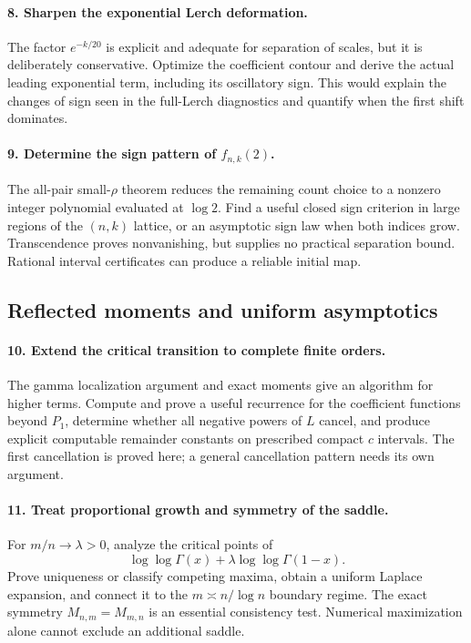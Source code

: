\paragraph{8. Sharpen the exponential Lerch deformation.}
The factor $e^{-k/20}$ is explicit and adequate for separation of
scales, but it is deliberately conservative. Optimize the coefficient
contour and derive the actual leading exponential term, including its
oscillatory sign. This would explain the changes of sign seen in the
full-Lerch diagnostics and quantify when the first shift dominates.

\paragraph{9. Determine the sign pattern of $f_{n,k}(2)$.}
The all-pair small-$\rho$ theorem reduces the remaining count choice
to a nonzero integer polynomial evaluated at $\log2$. Find a useful
closed sign criterion in large regions of the $(n,k)$ lattice, or an
asymptotic sign law when both indices grow. Transcendence proves
nonvanishing, but supplies no practical separation bound. Rational
interval certificates can produce a reliable initial map.

\subsection{Reflected moments and uniform asymptotics}

\paragraph{10. Extend the critical transition to complete finite orders.}
The gamma localization argument and exact moments give an algorithm
for higher terms. Compute and prove a useful recurrence for the
coefficient functions beyond $P_1$, determine whether all negative
powers of $L$ cancel, and produce explicit computable remainder
constants on prescribed compact $c$ intervals. The first cancellation
is proved here; a general cancellation pattern needs its own argument.

\paragraph{11. Treat proportional growth and symmetry of the saddle.}
For $m/n\to\lambda>0$, analyze the critical points of
\[
 \log\log\Gamma(x)+\lambda\log\log\Gamma(1-x).
\]
Prove uniqueness or classify competing maxima, obtain a uniform
Laplace expansion, and connect it to the $m\asymp n/\log n$
boundary regime. The exact symmetry $M_{n,m}=M_{m,n}$ is an
essential consistency test. Numerical maximization alone cannot
exclude an additional saddle.

